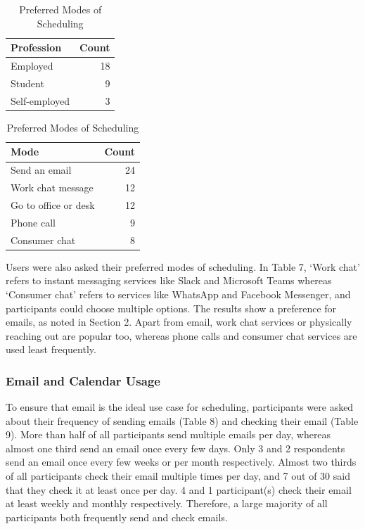 \documentclass{article}
\begin{document}
\begin{table}[!htb]
	\begin{minipage}{.5\linewidth}
		\caption{Professions of Participants}
		\centering
		\begin{tabular}{lr}
			\hline
			\textbf{Profession} & \textbf{Count} \\
			\hline
			Employed            & 18             \\
			Student             & 9              \\
			Self-employed       & 3              \\
			\hline
		\end{tabular}
	\end{minipage}%
	\hspace{.1cm}
	\begin{minipage}{.5\linewidth}
		\centering
		\caption{Preferred Modes of Scheduling}
		\begin{tabular}{lr}
			\hline
			\textbf{Mode}        & \textbf{Count} \\
			\hline
			Send an email        & 24             \\
			Work chat message    & 12             \\
			Go to office or desk & 12             \\
			Phone call           & 9              \\
			Consumer chat        & 8              \\
			\hline
		\end{tabular}
	\end{minipage}
\end{table}

Users were also asked their preferred modes of scheduling. In Table 7, `Work chat' refers to instant messaging services like Slack and Microsoft Teams whereas `Consumer chat' refers to services like WhatsApp and Facebook Messenger, and participants could choose multiple options. The results show a preference for emails, as noted in Section 2. Apart from email, work chat services or physically reaching out are popular too, whereas phone calls and consumer chat services are used least frequently.

\subsubsection{Email and Calendar Usage}

To ensure that email is the ideal use case for scheduling, participants were asked about their frequency of sending emails (Table 8) and checking their email (Table 9). More than half of all participants send multiple emails per day, whereas almost one third send an email once every few days. Only 3 and 2 respondents send an email once every few weeks or per month respectively. Almost two thirds of all participants check their email multiple times per day, and 7 out of 30 said that they check it at least once per day. 4 and 1 participant(s) check their email at least weekly and monthly respectively. Therefore, a large majority of all participants both frequently send and check emails.
\end{document}
